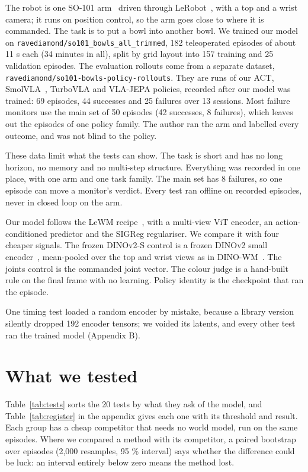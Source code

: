\documentclass[10pt,twocolumn]{article}
\begin{document}
The robot is one SO-101 arm~\citep{so101} driven through LeRobot~\citep{cadene2024lerobot}, with a top and a wrist camera; it runs on position control, so the arm goes close to where it is commanded. The task is to put a bowl into another bowl. We trained our model on \texttt{ravediamond/so101\_bowls\_all\_trimmed}, 182 teleoperated episodes of about 11 s each (34 minutes in all), split by grid layout into 157 training and 25 validation episodes. The evaluation rollouts come from a separate dataset, \texttt{ravediamond/so101-bowls-policy-rollouts}. They are runs of our ACT, SmolVLA~\citep{shukor2025smolvla}, TurboVLA and VLA-JEPA policies, recorded after our model was trained: 69 episodes, 44 successes and 25 failures over 13 sessions. Most failure monitors use the main set of 50 episodes (42 successes, 8 failures), which leaves out the episodes of one policy family. The author ran the arm and labelled every outcome, and was not blind to the policy.


These data limit what the tests can show. The task is short and has no long horizon, no memory and no multi-step structure. Everything was recorded in one place, with one arm and one task family. The main set has 8 failures, so one episode can move a monitor's verdict. Every test ran offline on recorded episodes, never in closed loop on the arm.


Our model follows the LeWM recipe~\citep{maes2026lewm}, with a multi-view ViT encoder, an action-conditioned predictor and the SIGReg regulariser. We compare it with four cheaper signals. The frozen DINOv2-S control is a frozen DINOv2 small encoder~\citep{oquab2023dinov2}, mean-pooled over the top and wrist views as in DINO-WM~\citep{zhou2024dinowm}. The joints control is the commanded joint vector. The colour judge is a hand-built rule on the final frame with no learning. Policy identity is the checkpoint that ran the episode.


One timing test loaded a random encoder by mistake, because a library version silently dropped 192 encoder tensors; we voided its latents, and every other test ran the trained model (Appendix B).


\section{What we tested}


Table~\ref{tab:tests} sorts the 20 tests by what they ask of the model, and Table~\ref{tab:register} in the appendix gives each one with its threshold and result. Each group has a cheap competitor that needs no world model, run on the same episodes. Where we compared a method with its competitor, a paired bootstrap over episodes (2,000 resamples, 95 \% interval) says whether the difference could be luck: an interval entirely below zero means the method lost.
\end{document}
